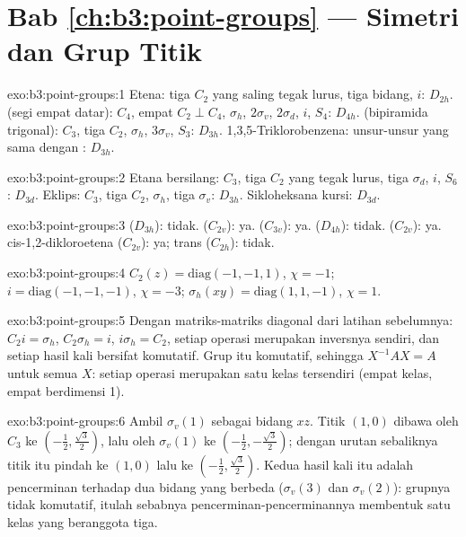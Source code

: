 \section*{Bab \ref{ch:b3:point-groups} --- Simetri dan Grup Titik}

\begin{solution}{exo:b3:point-groups:1}
Etena: tiga $C_2$ yang saling tegak lurus, tiga bidang, $i$: $D_{2h}$. 
(segi empat datar): $C_4$, empat $C_2 \perp C_4$, $\sigma_h$, $2\sigma_v$, $2\sigma_d$,
$i$, $S_4$: $D_{4h}$.  (bipiramida trigonal): $C_3$, tiga $C_2$, $\sigma_h$,
$3\sigma_v$, $S_3$: $D_{3h}$. 1,3,5-Triklorobenzena: unsur-unsur yang sama dengan
: $D_{3h}$.
\end{solution}

\begin{solution}{exo:b3:point-groups:2}
Etana bersilang: $C_3$, tiga $C_2$ yang tegak lurus, tiga $\sigma_d$, $i$, $S_6$:
$D_{3d}$. Eklips: $C_3$, tiga $C_2$, $\sigma_h$, tiga $\sigma_v$: $D_{3h}$.
Sikloheksana kursi: $D_{3d}$.
\end{solution}

\begin{solution}{exo:b3:point-groups:3}
 ($D_{3h}$): tidak.  ($C_{2v}$): ya.  ($C_{3v}$): ya.
 ($D_{4h}$): tidak.  ($C_{2v}$): ya. cis-1,2-dikloroetena
($C_{2v}$): ya; trans ($C_{2h}$): tidak.
\end{solution}

\begin{solution}{exo:b3:point-groups:4}
$C_2(z) = \mathrm{diag}(-1,-1,1)$, $\chi = -1$; $i = \mathrm{diag}(-1,-1,-1)$,
$\chi = -3$; $\sigma_h(xy) = \mathrm{diag}(1,1,-1)$, $\chi = 1$.
\end{solution}

\begin{solution}{exo:b3:point-groups:5}
Dengan matriks-matriks diagonal dari latihan sebelumnya: $C_2i = \sigma_h$,
$C_2\sigma_h =
i$, $i\sigma_h = C_2$, setiap operasi merupakan inversnya sendiri,
dan setiap hasil kali bersifat komutatif. Grup itu komutatif, sehingga
$X^{-1}AX = A$ untuk semua $X$: setiap operasi merupakan satu kelas tersendiri
(empat kelas, empat  berdimensi 1).
\end{solution}

\begin{solution}{exo:b3:point-groups:6}
Ambil $\sigma_v(1)$ sebagai bidang $xz$. Titik $(1,0)$ dibawa oleh $C_3$ ke $(-\frac12,
\frac{\sqrt3}2)$, lalu oleh $\sigma_v(1)$ ke $(-\frac12,-\frac{\sqrt3}2)$; dengan urutan
sebaliknya titik itu pindah ke $(1,0)$ lalu ke $(-\frac12,\frac{\sqrt3}2)$. Kedua
hasil kali itu adalah pencerminan terhadap dua bidang yang berbeda
($\sigma_v(3)$ dan $\sigma_v(2)$): grupnya tidak komutatif, itulah sebabnya
pencerminan-pencerminannya membentuk satu kelas yang beranggota tiga.
\end{solution}

